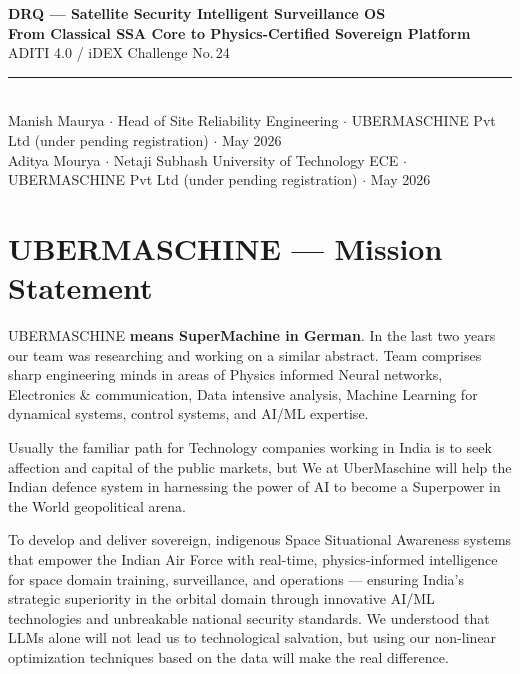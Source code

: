 \documentclass[11pt,a4paper]{article}
\begin{document}
\begin{center}
\vspace*{1em}
{\LARGE\bfseries\textsf{DRQ} --- Satellite Security Intelligent Surveillance OS}\\[0.4em]
{\large\textcolor{dblue}{\textbf{From Classical SSA Core to Physics-Certified Sovereign Platform}}}\\[1em]
{\normalsize ADITI 4.0 / iDEX Challenge No.\,24}\\[0.3em]
\rule{0.55\textwidth}{0.5pt}\\[0.6em]
{\small Manish Maurya $\cdot$ Head of Site Reliability Engineering $\cdot$ UBERMASCHINE Pvt Ltd (under pending registration) $\cdot$ May 2026}\\[0.2em]
{\small Aditya Mourya $\cdot$ Netaji Subhash University of Technology ECE $\cdot$ UBERMASCHINE Pvt Ltd (under pending registration) $\cdot$ May 2026}
\end{center}

\vspace{1em}

\section{UBERMASCHINE --- Mission Statement}

UBERMASCHINE \textbf{means SuperMachine in German}.
In the last two years our team was researching and working on a similar abstract. Team comprises sharp engineering minds in areas of Physics informed Neural networks, Electronics \& communication, Data intensive analysis, Machine Learning for dynamical systems, control systems, and AI/ML expertise.

Usually the familiar path for Technology companies working in India is to seek affection and capital of the public markets, but We at UberMaschine will help the Indian defence system in harnessing the power of AI to become a Superpower in the World geopolitical arena.

To develop and deliver sovereign, indigenous Space Situational Awareness systems that empower the Indian Air Force with real-time, physics-informed intelligence for space domain training, surveillance, and operations --- ensuring India's strategic superiority in the orbital domain through innovative AI/ML technologies and unbreakable national security standards. We understood that LLMs alone will not lead us to technological salvation, but using our non-linear optimization techniques based on the data will make the real difference.
\end{document}
